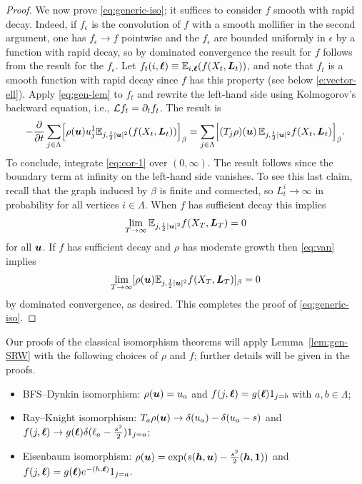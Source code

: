 \documentclass[11pt,a4paper]{article}
\begin{document}
\begin{proof}
  We now prove \eqref{eq:generic-iso}; it suffices to consider $f$
  smooth with rapid decay.  Indeed, if $f_\epsilon$ is the convolution
  of $f$ with a smooth mollifier in the second argument, one has
  $f_\epsilon \to f$ pointwise and the $f_\epsilon$ are bounded
  uniformly in $\epsilon$ by a function with rapid decay, so by
  dominated convergence the result for $f$ follows from the result for
  the $f_\epsilon$.  Let
  $f_{t}(i,\boldsymbol{\ell}) \equiv \mathbb{E}_{i,\boldsymbol{\ell}} (f(X_{t},\boldsymbol{L}_{t}))$, and
  note that $f_t$ is a smooth function with rapid decay since $f$ has
  this property (see below \eqref{e:vector-ell}).  Apply
  \eqref{eq:gen-lem} to $f_{t}$ and rewrite the left-hand side using
  Kolmogorov's backward equation, i.e.,
  $\mathcal L f_{t} = \partial_{t}f_{t}$. The result is
  \begin{equation}
    \label{eq:cor-1}
    -\ddp{}{t}\sum_{j\in\Lambda}\uspin{\rho(\V{u}) u_{j}^1
      \E_{j,\frac{1}{2}|\V{u}|^2}(f(X_{t},\V{L}_{t}))}_{\beta}
    =
    \sum_{j\in \Lambda}\uspin{(T_j\rho)(\V{u})\, \E_{j,\frac{1}{2}|\V{u}|^{2}}f(X_{t},\V{L}_{t})}_{\beta}
    .
  \end{equation}
  To conclude, integrate \eqref{eq:cor-1} over $(0,\infty)$.
  The result follows since
  the boundary term at infinity on the
  left-hand side vanishes. To see this last claim, recall that the graph
  induced by $\beta$ is finite and connected, so
  $L^{i}_{t}\to\infty$ in probability for all vertices
  $i\in\Lambda$. When $f$ has sufficient decay this implies
  \begin{equation}
    \label{eq:van}
    \lim_{T\to\infty} \mathbb{E}_{j,\frac{1}{2}|\boldsymbol{u}|^{2}} f(X_{T},\boldsymbol{L}_{T})=0
  \end{equation}
  for all $\boldsymbol{u}$. If $f$ has sufficient decay and $\rho$ has moderate
  growth then \eqref{eq:van} implies 
  \begin{equation}
    \label{eq:van2}
    \lim_{T\to\infty} [ \rho(\boldsymbol{u}) \mathbb{E}_{j,\frac{1}{2} | \boldsymbol{u}|^{2}} f(X_T,\boldsymbol{L}_T)]_{\beta} = 0
  \end{equation}
  by dominated convergence, as desired.
  This completes the proof of \eqref{eq:generic-iso}.
\end{proof}


Our proofs of the classical isomorphism theorems will apply
Lemma~\ref{lem:gen-SRW} with
the following choices of $\rho$ and $f$;
further details will be given in the proofs.
\begin{itemize}
\item BFS--Dynkin isomorphism: $\rho(\boldsymbol{u}) = u_a$ and
  $f(j,\boldsymbol{\ell}) = g(\boldsymbol{\ell})1_{j=b}$ with $a,b\in\Lambda$;
\item Ray--Knight isomorphism:
  $T_a\rho(\boldsymbol{u}) \to \delta(u_a)-\delta(u_a-s)$ and
  $f(j,\boldsymbol{\ell}) \to g(\boldsymbol{\ell})\delta(\ell_a -\frac{s^2}{2})1_{j=a}$;
\item Eisenbaum isomorphism:
  $\rho(\boldsymbol{u}) =  \exp (s(\boldsymbol{h},\boldsymbol{u}) -  \frac{s^2}{2}(\boldsymbol{h},\boldsymbol{1}) )$ 
  and
  $f(j,\boldsymbol{\ell}) = g(\boldsymbol{\ell})e^{-(h,\boldsymbol{\ell})} 1_{j=a}$.
\end{itemize}
\end{document}
